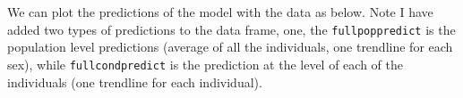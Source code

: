 \documentclass[]{article}
\newenvironment{Shaded}{\begin{snugshade}}{\end{snugshade}}
\newcommand{\KeywordTok}[1]{\textcolor[rgb]{0.13,0.29,0.53}{\textbf{#1}}}
\newcommand{\DataTypeTok}[1]{\textcolor[rgb]{0.13,0.29,0.53}{#1}}
\newcommand{\StringTok}[1]{\textcolor[rgb]{0.31,0.60,0.02}{#1}}
\newcommand{\OtherTok}[1]{\textcolor[rgb]{0.56,0.35,0.01}{#1}}
\newcommand{\OperatorTok}[1]{\textcolor[rgb]{0.81,0.36,0.00}{\textbf{#1}}}
\newcommand{\NormalTok}[1]{#1}
\begin{document}
We can plot the predictions of the model with the data as below. Note I
have added two types of predictions to the data frame, one, the
\texttt{fullpoppredict} is the population level predictions (average of
all the individuals, one trendline for each sex), while
\texttt{fullcondpredict} is the prediction at the level of each of the
individuals (one trendline for each individual).

\begin{Shaded}
\end{Shaded}
\end{document}
